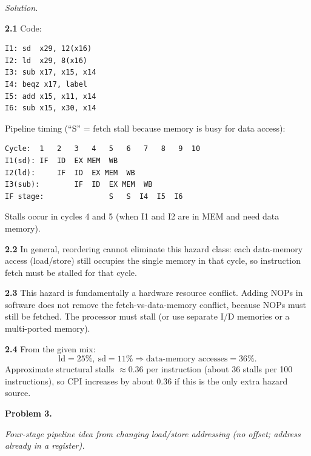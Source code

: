 \documentclass[12pt]{article}
\newcommand{\problem}[1]{\vspace{0.8em}\noindent\textbf{Problem #1.}\vspace{0.35em}}
\newenvironment{solution}{\par\noindent\textit{Solution.}\ }{\par\vspace{1.1em}}
\newcommand{\subproblem}[1]{\par\vspace{0.45em}\noindent\textbf{#1}\quad}
\newcommand{\assigntext}[1]{\par\vspace{0.25em}\small\textit{#1}\par\vspace{0.35em}}
\begin{document}
\begin{solution}
\subproblem{2.1}
Code:
\begin{verbatim}
I1: sd  x29, 12(x16)
I2: ld  x29, 8(x16)
I3: sub x17, x15, x14
I4: beqz x17, label
I5: add x15, x11, x14
I6: sub x15, x30, x14
\end{verbatim}

Pipeline timing (``S'' = fetch stall because memory is busy for data access):
\begin{verbatim}
Cycle:  1   2   3   4   5   6   7   8   9  10
I1(sd): IF  ID  EX MEM  WB
I2(ld):     IF  ID  EX MEM  WB
I3(sub):        IF  ID  EX MEM  WB
IF stage:               S   S  I4  I5  I6
\end{verbatim}
Stalls occur in cycles 4 and 5 (when I1 and I2 are in MEM and need data memory).

\subproblem{2.2}
In general, reordering cannot eliminate this hazard class: each data-memory access (load/store) still occupies the single memory in that cycle, so instruction fetch must be stalled for that cycle.

\subproblem{2.3}
This hazard is fundamentally a hardware resource conflict. Adding NOPs in software does not remove the fetch-vs-data-memory conflict, because NOPs must still be fetched. The processor must stall (or use separate I/D memories or a multi-ported memory).

\subproblem{2.4}
From the given mix:
\[
\text{ld}=25\%,\ \text{sd}=11\% \Rightarrow \text{data-memory accesses}=36\%.
\]
Approximate structural stalls $\approx 0.36$ per instruction (about 36 stalls per 100 instructions), so CPI increases by about 0.36 if this is the only extra hazard source.
\end{solution}

\problem{3}
\assigntext{Four-stage pipeline idea from changing load/store addressing (no offset; address already in a register).}
\end{document}
